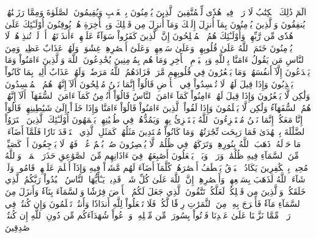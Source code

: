 الٓمٓ
ذَٰلِكَ ٱلۡكِتَٰبُ لَا رَيۡبَۛ فِيهِۛ هُدٗى لِّلۡمُتَّقِينَ
ٱلَّذِينَ يُؤۡمِنُونَ بِٱلۡغَيۡبِ وَيُقِيمُونَ ٱلصَّلَوٰةَ وَمِمَّا رَزَقۡنَٰهُمۡ يُنفِقُونَ
وَٱلَّذِينَ يُؤۡمِنُونَ بِمَآ أُنزِلَ إِلَيۡكَ وَمَآ أُنزِلَ مِن قَبۡلِكَ وَبِٱلۡأٓخِرَةِ هُمۡ يُوقِنُونَ
أُوْلَـٰٓئِكَ عَلَىٰ هُدٗى مِّن رَّبِّهِمۡۖ وَأُوْلَـٰٓئِكَ هُمُ ٱلۡمُفۡلِحُونَ
إِنَّ ٱلَّذِينَ كَفَرُواْ سَوَآءٌ عَلَيۡهِمۡ ءَأَنذَرۡتَهُمۡ أَمۡ لَمۡ تُنذِرۡهُمۡ لَا يُؤۡمِنُونَ
خَتَمَ ٱللَّهُ عَلَىٰ قُلُوبِهِمۡ وَعَلَىٰ سَمۡعِهِمۡۖ وَعَلَىٰٓ أَبۡصَٰرِهِمۡ غِشَٰوَةٞۖ وَلَهُمۡ عَذَابٌ عَظِيمٞ
وَمِنَ ٱلنَّاسِ مَن يَقُولُ ءَامَنَّا بِٱللَّهِ وَبِٱلۡيَوۡمِ ٱلۡأٓخِرِ وَمَا هُم بِمُؤۡمِنِينَ
يُخَٰدِعُونَ ٱللَّهَ وَٱلَّذِينَ ءَامَنُواْ وَمَا يَخۡدَعُونَ إِلَّآ أَنفُسَهُمۡ وَمَا يَشۡعُرُونَ
فِي قُلُوبِهِم مَّرَضٞ فَزَادَهُمُ ٱللَّهُ مَرَضٗاۖ وَلَهُمۡ عَذَابٌ أَلِيمُۢ بِمَا كَانُواْ يَكۡذِبُونَ
وَإِذَا قِيلَ لَهُمۡ لَا تُفۡسِدُواْ فِي ٱلۡأَرۡضِ قَالُوٓاْ إِنَّمَا نَحۡنُ مُصۡلِحُونَ
أَلَآ إِنَّهُمۡ هُمُ ٱلۡمُفۡسِدُونَ وَلَٰكِن لَّا يَشۡعُرُونَ
وَإِذَا قِيلَ لَهُمۡ ءَامِنُواْ كَمَآ ءَامَنَ ٱلنَّاسُ قَالُوٓاْ أَنُؤۡمِنُ كَمَآ ءَامَنَ ٱلسُّفَهَآءُۗ أَلَآ إِنَّهُمۡ هُمُ ٱلسُّفَهَآءُ وَلَٰكِن لَّا يَعۡلَمُونَ
وَإِذَا لَقُواْ ٱلَّذِينَ ءَامَنُواْ قَالُوٓاْ ءَامَنَّا وَإِذَا خَلَوۡاْ إِلَىٰ شَيَٰطِينِهِمۡ قَالُوٓاْ إِنَّا مَعَكُمۡ إِنَّمَا نَحۡنُ مُسۡتَهۡزِءُونَ
ٱللَّهُ يَسۡتَهۡزِئُ بِهِمۡ وَيَمُدُّهُمۡ فِي طُغۡيَٰنِهِمۡ يَعۡمَهُونَ
أُوْلَـٰٓئِكَ ٱلَّذِينَ ٱشۡتَرَوُاْ ٱلضَّلَٰلَةَ بِٱلۡهُدَىٰ فَمَا رَبِحَت تِّجَٰرَتُهُمۡ وَمَا كَانُواْ مُهۡتَدِينَ
مَثَلُهُمۡ كَمَثَلِ ٱلَّذِي ٱسۡتَوۡقَدَ نَارٗا فَلَمَّآ أَضَآءَتۡ مَا حَوۡلَهُۥ ذَهَبَ ٱللَّهُ بِنُورِهِمۡ وَتَرَكَهُمۡ فِي ظُلُمَٰتٖ لَّا يُبۡصِرُونَ
صُمُّۢ بُكۡمٌ عُمۡيٞ فَهُمۡ لَا يَرۡجِعُونَ
أَوۡ كَصَيِّبٖ مِّنَ ٱلسَّمَآءِ فِيهِ ظُلُمَٰتٞ وَرَعۡدٞ وَبَرۡقٞ يَجۡعَلُونَ أَصَٰبِعَهُمۡ فِيٓ ءَاذَانِهِم مِّنَ ٱلصَّوَٰعِقِ حَذَرَ ٱلۡمَوۡتِۚ وَٱللَّهُ مُحِيطُۢ بِٱلۡكَٰفِرِينَ
يَكَادُ ٱلۡبَرۡقُ يَخۡطَفُ أَبۡصَٰرَهُمۡۖ كُلَّمَآ أَضَآءَ لَهُم مَّشَوۡاْ فِيهِ وَإِذَآ أَظۡلَمَ عَلَيۡهِمۡ قَامُواْۚ وَلَوۡ شَآءَ ٱللَّهُ لَذَهَبَ بِسَمۡعِهِمۡ وَأَبۡصَٰرِهِمۡۚ إِنَّ ٱللَّهَ عَلَىٰ كُلِّ شَيۡءٖ قَدِيرٞ
يَـٰٓأَيُّهَا ٱلنَّاسُ ٱعۡبُدُواْ رَبَّكُمُ ٱلَّذِي خَلَقَكُمۡ وَٱلَّذِينَ مِن قَبۡلِكُمۡ لَعَلَّكُمۡ تَتَّقُونَ
ٱلَّذِي جَعَلَ لَكُمُ ٱلۡأَرۡضَ فِرَٰشٗا وَٱلسَّمَآءَ بِنَآءٗ وَأَنزَلَ مِنَ ٱلسَّمَآءِ مَآءٗ فَأَخۡرَجَ بِهِۦ مِنَ ٱلثَّمَرَٰتِ رِزۡقٗا لَّكُمۡۖ فَلَا تَجۡعَلُواْ لِلَّهِ أَندَادٗا وَأَنتُمۡ تَعۡلَمُونَ
وَإِن كُنتُمۡ فِي رَيۡبٖ مِّمَّا نَزَّلۡنَا عَلَىٰ عَبۡدِنَا فَأۡتُواْ بِسُورَةٖ مِّن مِّثۡلِهِۦ وَٱدۡعُواْ شُهَدَآءَكُم مِّن دُونِ ٱللَّهِ إِن كُنتُمۡ صَٰدِقِينَ
